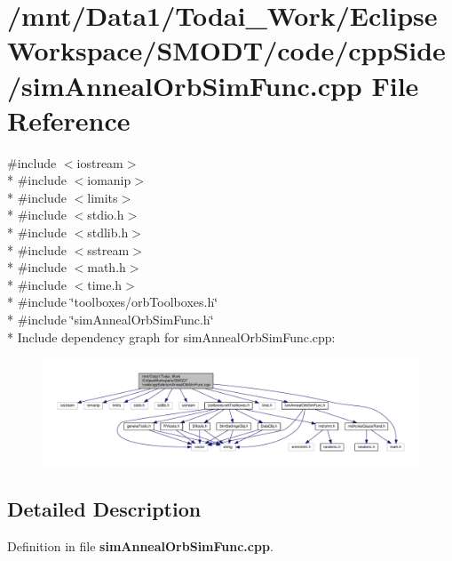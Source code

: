 \section{/mnt/\-Data1/\-Todai\-\_\-\-Work/\-Eclipse\-Workspace/\-S\-M\-O\-D\-T/code/cpp\-Side/sim\-Anneal\-Orb\-Sim\-Func.cpp File Reference}
\label{sim_anneal_orb_sim_func_8cpp}
{\ttfamily \#include $<$iostream$>$}\\*
{\ttfamily \#include $<$iomanip$>$}\\*
{\ttfamily \#include $<$limits$>$}\\*
{\ttfamily \#include $<$stdio.\-h$>$}\\*
{\ttfamily \#include $<$stdlib.\-h$>$}\\*
{\ttfamily \#include $<$sstream$>$}\\*
{\ttfamily \#include $<$math.\-h$>$}\\*
{\ttfamily \#include $<$time.\-h$>$}\\*
{\ttfamily \#include \char`\"{}toolboxes/orb\-Toolboxes.\-h\char`\"{}}\\*
{\ttfamily \#include \char`\"{}sim\-Anneal\-Orb\-Sim\-Func.\-h\char`\"{}}\\*
Include dependency graph for sim\-Anneal\-Orb\-Sim\-Func.\-cpp\-:
\nopagebreak
\begin{figure}[H]
\begin{center}
\leavevmode
\includegraphics[width=350pt]{sim_anneal_orb_sim_func_8cpp__incl}
\end{center}
\end{figure}


\subsection{Detailed Description}


Definition in file {\bf sim\-Anneal\-Orb\-Sim\-Func.\-cpp}.

